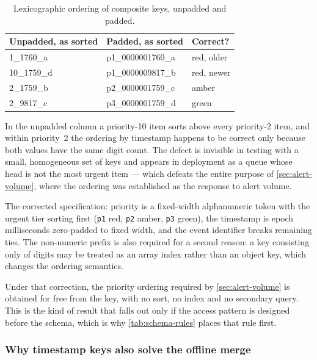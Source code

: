 \documentclass[12pt,a4paper,oneside]{report}
\begin{document}
\begin{table}[htbp]
\centering\small
\caption{Lexicographic ordering of composite keys, unpadded and padded.}\label{tab:key-sort}
\begin{tabularx}{\textwidth}{@{}>{\ttfamily\footnotesize}p{4.2cm} >{\ttfamily\footnotesize}p{4.2cm} X@{}}
\toprule
\normalfont\textbf{Unpadded, as sorted} & \normalfont\textbf{Padded, as sorted} & \normalfont\textbf{Correct?} \\
\midrule
1\_1760\_a & p1\_0000001760\_a & red, older \\
10\_1759\_d & p1\_0000009817\_b & red, newer \\
2\_1759\_b & p2\_0000001759\_c & amber \\
2\_9817\_c & p3\_0000001759\_d & green \\
\bottomrule
\end{tabularx}
\end{table}

In the unpadded column a priority-10 item sorts above every priority-2 item, and within priority~2 the ordering by timestamp happens to be correct only because both values have the same digit count. The defect is invisible in testing with a small, homogeneous set of keys and appears in deployment as a queue whose head is not the most urgent item --- which defeats the entire purpose of \cref{sec:alert-volume}, where the ordering was established as the response to alert volume.

The corrected specification: priority is a fixed-width alphanumeric token with the urgent tier sorting first (\texttt{p1} red, \texttt{p2} amber, \texttt{p3} green), the timestamp is epoch milliseconds zero-padded to fixed width, and the event identifier breaks remaining ties. The non-numeric prefix is also required for a second reason: a key consisting only of digits may be treated as an array index rather than an object key, which changes the ordering semantics.

Under that correction, the priority ordering required by \cref{sec:alert-volume} is obtained for free from the key, with no sort, no index and no secondary query. This is the kind of result that falls out only if the access pattern is designed before the schema, which is why \cref{tab:schema-rules} places that rule first.

\subsubsection{Why timestamp keys also solve the offline merge}
\end{document}
